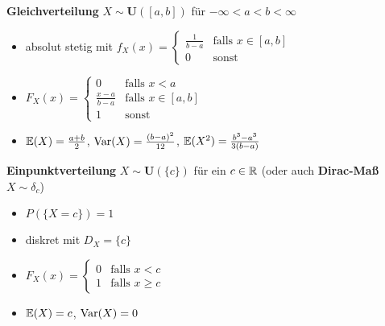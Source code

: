 \textbf{Gleichverteilung} $X\sim\mathbf{U}([a,b])$ für $-\infty < a < b < \infty$
\begin{itemize}
\item absolut stetig mit
  $f_X(x) = \begin{cases}
  \frac{1}{b-a} 	& \text{falls } x \in [a,b]	\\
  0				& \text{sonst }
  \end{cases}$

\item
  $F_X(x) = \begin{cases}
  0               & \text{falls } x < a	    	\\
  \frac{x-a}{b-a} & \text{falls } x \in [a,b]	\\
  1               & \text{sonst}
  \end{cases}$

\item $\mathbb{E}(X) = \frac{a+b}{2}$, $\operatorname{Var}(X) = \frac{(b-a)^2}{12}$,
  $\mathbb{E}(X^2) = \frac{b^3-a^3}{3(b-a)}$
\end{itemize}

\textbf{Einpunktverteilung} $X\sim\mathbf{U}(\{c\})$ für ein $c\in\mathbb{R}$ (oder auch \textbf{Dirac-Maß} $X\sim\delta_c$)
\begin{itemize}
\item $P(\{X=c\}) = 1$

\item diskret mit $D_X = \{c\}$

\item
  $F_X(x) = \begin{cases}
  0 	&\text{falls } x < c     \\
  1 & \text{falls } x \geq c
  \end{cases}$

\item $\mathbb{E}(X) = c$, $\operatorname{Var}(X) = 0$
\end{itemize}

